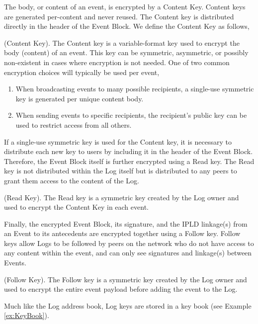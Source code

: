 \documentclass{comjnl}
\begin{document}
The body, or content of an event, is encrypted by a Content Key. Content keys are generated per-content and never reused. The Content key is distributed directly in the header of the Event Block. We define the Content Key as follows,

\begin{definition}
(Content Key). The Content key is a variable-format key used to encrypt the body (content) of an event. This key can be symmetric, asymmetric, or possibly non-existent in cases where encryption is not needed. One of two common encryption choices will typically be used per event, 
\begin{enumerate}
\item \label{Perf1}When broadcasting events to many possible recipients, a single-use symmetric key is generated per unique content body.
\item \label{Perf2}When sending events to specific recipients, the recipient's public key can be used to restrict access from all others.
\end{enumerate}
\end{definition}

If a single-use symmetric key is used for the Content key, it is necessary to distribute each new key to users by including it in the header of the Event Block. Therefore, the Event Block itself is further encrypted using a Read key. The Read key is not distributed within the Log itself but is distributed to any peers to grant them access to the content of the Log. 

\begin{definition}
 (Read Key). The Read key is a symmetric key created by the Log owner and used to encrypt the Content Key in each event.
\end{definition}

Finally, the encrypted Event Block, its signature, and the IPLD linkage(s) from an Event to its antecedents are encrypted together using a Follow key. Follow keys allow Logs to be followed by peers on the network who do not have access to any content within the event, and can only see signatures and linkage(s) between Events.

\begin{definition}
(Follow Key). The Follow key is a symmetric key created by the Log owner and used to encrypt the entire event payload before adding the event to the Log.
\end{definition}

Much like the Log address book, Log keys are stored in a key book (see Example \ref{ex:KeyBook}).
\end{document}
